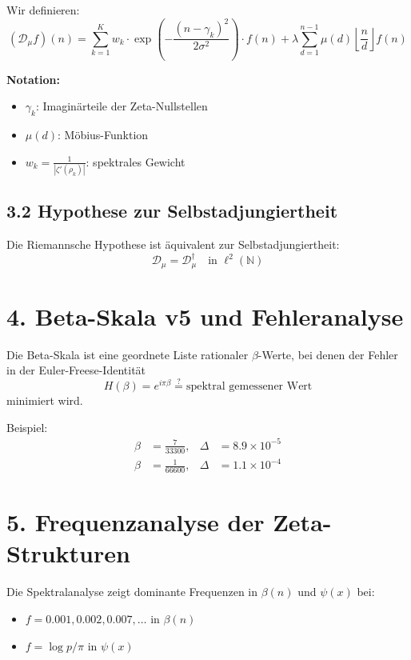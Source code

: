 \documentclass[12pt]{article}
\begin{document}
Wir definieren:
\[
(\mathcal{D}_\mu f)(n) = \sum_{k=1}^{K} w_k \cdot \exp\left(-\frac{(n - \gamma_k)^2}{2\sigma^2} \right) \cdot f(n) + \lambda \sum_{d=1}^{n-1} \mu(d) \left\lfloor \frac{n}{d} \right\rfloor f(n)
\]

\textbf{Notation:}
\begin{itemize}
  \item \(\gamma_k\): Imaginärteile der Zeta-Nullstellen
  \item \(\mu(d)\): Möbius-Funktion
  \item \(w_k = \frac{1}{|\zeta'(\rho_k)|}\): spektrales Gewicht
\end{itemize}

\subsection*{3.2 Hypothese zur Selbstadjungiertheit}
Die Riemannsche Hypothese ist äquivalent zur Selbstadjungiertheit:
\[
\mathcal{D}_\mu = \mathcal{D}_\mu^\dagger \quad \text{in } \ell^2(\mathbb{N})
\]

\section*{4. Beta-Skala v5 und Fehleranalyse}

Die Beta-Skala ist eine geordnete Liste rationaler \(\beta\)-Werte, bei denen der Fehler in der Euler-Freese-Identität
\[
H(\beta) = e^{i\pi\beta} \overset{?}{=} \text{spektral gemessener Wert}
\]
minimiert wird.

Beispiel:
\begin{align*}
\beta &= \frac{7}{33300}, & \Delta &= 8.9 \times 10^{-5} \\
\beta &= \frac{1}{66600}, & \Delta &= 1.1 \times 10^{-4}
\end{align*}

\section*{5. Frequenzanalyse der Zeta-Strukturen}

Die Spektralanalyse zeigt dominante Frequenzen in \(\beta(n)\) und \(\psi(x)\) bei:

\begin{itemize}
  \item \(f = 0.001, 0.002, 0.007, \ldots\) in \(\beta(n)\)
  \item \(f = \log p / \pi\) in \(\psi(x)\)
\end{itemize}
\end{document}
